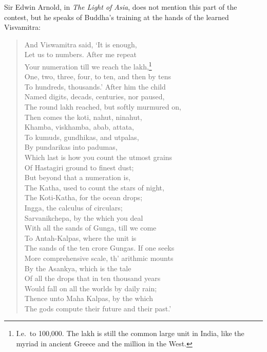 \documentclass[11pt,a4paper]{article}
\begin{document}
Sir Edwin Arnold, in \textit{The Light of Asia}, does not mention this part of the contest, but he speaks of Buddha's training at the hands of the learned Visvamitra:

\begin{verse}
And Viswamitra said, `It is enough,\\
Let us to numbers. After me repeat\\
Your numeration till we reach the lakh,\footnote{I.e.\ to 100,000. The lakh is still the common large unit in India, like the myriad in ancient Greece and the million in the West.}\\
One, two, three, four, to ten, and then by tens\\
To hundreds, thousands.' After him the child\\
Named digits, decads, centuries, nor paused,\\
The round lakh reached, but softly murmured on,\\
Then comes the koti, nahut, ninahut,\\
Khamba, viskhamba, abab, attata,\\
To kumuds, gundhikas, and utpalas,\\
By pundarikas into padumas,\\
Which last is how you count the utmost grains\\
Of Hastagiri ground to finest dust;\\
But beyond that a numeration is,\\
The Katha, used to count the stars of night,\\
The Koti-Katha, for the ocean drops;\\
Ingga, the calculus of circulars;\\
Sarvanikchepa, by the which you deal\\
With all the sands of Gunga, till we come\\
To Antah-Kalpas, where the unit is\\
The sands of the ten crore Gungas. If one seeks\\
More comprehensive scale, th' arithmic mounts\\
By the Asankya, which is the tale\\
Of all the drops that in ten thousand years\\
Would fall on all the worlds by daily rain;\\
Thence unto Maha Kalpas, by the which\\
The gods compute their future and their past.'
\end{verse}
\end{document}
